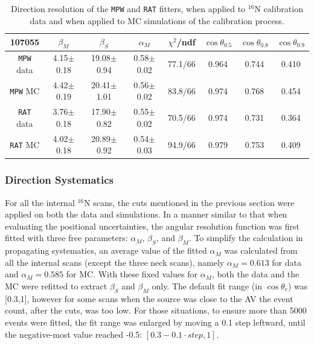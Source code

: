 \begin{table}[ht]
	\caption[Direction resolution of the \texttt{MPW} and \texttt{RAT} fitters.]{Direction resolution of the \texttt{MPW} and \texttt{RAT} fitters, when applied to $^{16}$N calibration data and when applied to MC simulations of the calibration process.\label{tab:angularResolValuesUpdated}}
	\begin{tabular}{cccccccc}%
		\toprule
	107055& $\beta_M$ &  $\beta_S$ & $\alpha_M$ & $\chi^2$/ndf & $\cos\theta_{0.5}$ & $\cos\theta_{0.8}$& $\cos\theta_{0.9}$\\
	\hline
	\texttt{MPW} data & 4.15$\pm$0.18 & 19.08$\pm$0.94 & 0.58$\pm$0.02 & 77.1/66 & 0.964 & 0.744 & 0.410 \\
	\texttt{MPW} MC & 4.42$\pm$0.19 & 20.41$\pm$1.01 & 0.56$\pm$0.02 & 83.8/66 & 0.974 & 0.768 & 0.454	 \\	
\hline
	\texttt{RAT} data & 3.76$\pm$0.18 & 17.90$\pm$0.82 & 0.55$\pm$0.02 & 70.5/66 & 0.974 & 0.731 & 0.364 \\
	\texttt{RAT} MC & 4.02$\pm$0.18 & 20.89$\pm$0.92 & 0.54$\pm$0.03 & 94.9/66 & 0.979 & 0.753 & 0.409	\\
		\bottomrule
	\end{tabular}
\end{table}

\subsubsection{Direction Systematics}

For all the internal $^{16}$N scans, the cuts mentioned in the previous section were applied on both the data and simulations. In a manner similar to that when evaluating the positional uncertainties, the angular resolution function was first fitted with three free parameters: $\alpha_M$, $\beta_S$, and $\beta_M$. To simplify the calculation in propagating systematics, an average value of the fitted $\alpha_M$ was calculated from all the internal scans (except the three neck scans), namely $\alpha_M =  0.613$ for data and $\alpha_M = 0.585$ for MC. With these fixed values for $\alpha_M$, both the data and the MC were refitted to extract $\beta_S$ and $\beta_M$ only. The default fit range (in $\cos \theta_e$) was [0.3,1], however for some scans when the source was close to the AV the event count, after the cuts, was too low. For those situations, to ensure more than 5000 events were fitted, the fit range was enlarged by moving a 0.1 step leftward, until the negative-most value reached -0.5: $[0.3-0.1 \cdot step, 1]$.

